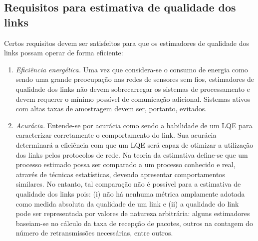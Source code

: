 \documentclass[
	12pt,				%
	openright,			%
	oneside,
	a4paper,			%
	english,			%
	french,				%
	spanish,			%
	brazil				%
	]{abntex2}
\begin{document}
\subsection{Requisitos para estimativa de qualidade dos links}

Certos requisitos devem ser satisfeitos para que os estimadores de qualidade dos links possam operar de forma eficiente:

\begin{enumerate}
	\item \textit{Eficiência energética.} Uma vez que considera-se o consumo de energia como sendo uma grande preocupação nas redes de sensores sem fios, estimadores de qualidade dos links não devem sobrecarregar os sistemas de processamento e devem requerer o mínimo possível de comunicação adicional. Sistemas ativos com altas taxas de amostragem devem ser, portanto, evitados.
	\item \textit{Acurácia.} Entende-se por acurácia como sendo a habilidade de um LQE para caracterizar corretamente o comportamento do link. Sua acurácia determinará a eficiência com que um LQE será capaz de otimizar a utilização dos links pelos protocolos de rede. Na teoria da estimativa define-se que um processo estimado possa ser comparado a um processo conhecido e real, através de técnicas estatísticas, devendo apresentar comportamentos similares. No entanto, tal comparação não é possível para a estimativa de qualidade dos links pois: (i) não há nenhuma métrica amplamente adotada como medida absoluta da qualidade de um link e (ii) a qualidade do link pode ser representada por valores de natureza arbitrária: alguns estimadores baseiam-se no cálculo da taxa de recepção de pacotes, outros na contagem do número de retransmissões necessárias, entre outros. 


\end{enumerate}
\end{document}
